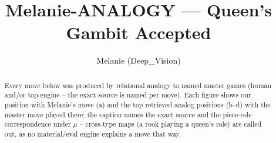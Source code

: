 \documentclass[11pt]{article}
\title{Melanie-ANALOGY — Queen's Gambit Accepted}
\author{Melanie (Deep\_Vision)}
\date{}
\begin{document}
\maketitle

\begin{abstract}Every move below was produced by relational analogy to named master games (human and/or top-engine -- the exact source is named per move). Each figure shows our position with Melanie's move (a) and the top retrieved analog positions (b--d) with the master move played there; the caption names the exact source and the piece-role correspondence under $\mu$ -- cross-type maps (a rook playing a queen's role) are called out, as no material/eval engine explains a move that way.\end{abstract}

\begin{figure}[p]\centering
\begin{subfigure}{0.46\textwidth}\centering
\resizebox{\linewidth}{!}{%
\newchessgame
\chessboard[
  setfen={rnbqkb1r/1p3ppp/p3pn2/2p5/2BP4/4PN2/PP3PPP/RNBQ1RK1 w kq - 0 7},
  showmover=false,
  pgfstyle=straightmove, color=movearrow, markmove={c4-b3}
]}
\caption{}
\end{subfigure}\hfill
\begin{subfigure}{0.46\textwidth}\centering
\resizebox{\linewidth}{!}{%
\newchessgame
\chessboard[
  setfen={rnbqkb1r/1p3ppp/p3pn2/2p5/2BP4/4PN2/PP3PPP/RNBQ1RK1 w kq - 2 7},
  showmover=false,
  pgfstyle=straightmove, color=movearrow, markmove={c4-b3}
]}
\caption{}
\end{subfigure}
\\[4pt]
\begin{subfigure}{0.46\textwidth}\centering
\resizebox{\linewidth}{!}{%
\newchessgame
\chessboard[
  setfen={rnbqkb1r/1p3ppp/p3pn2/2p5/2BP4/4PN2/PP3PPP/RNBQ1RK1 w kq - 2 7},
  showmover=false,
  pgfstyle=straightmove, color=movearrow, markmove={c4-b3}
]}
\caption{}
\end{subfigure}\hfill
\begin{subfigure}{0.46\textwidth}\centering
\resizebox{\linewidth}{!}{%
\newchessgame
\chessboard[
  setfen={rnbqkb1r/1p3ppp/p3pn2/2p5/2BP4/4PN2/PP3PPP/RNBQ1RK1 w kq - 2 7},
  showmover=false,
  pgfstyle=straightmove, color=movearrow, markmove={c4-b3}
]}
\caption{}
\end{subfigure}

\end{figure}
\end{document}
